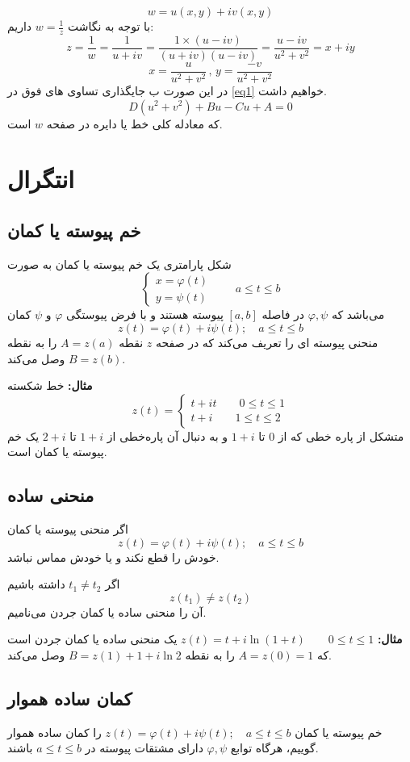 \documentclass[12pt]{report}
\begin{document}
	 $$w = u(x, y) + iv(x, y)$$
	 با توجه به نگاشت 
	 $w = \frac{1}{z}$
	 داریم:
	 $$z = \frac{1}{w} = \frac{1}{u + iv}=\frac{1 \times (u - iv)}{(u+iv)(u - iv)} = \frac{u - iv}{u^2+v^2} = x +iy$$
	 $$x = \frac{u}{u^2 + v^2}\,,\, y = \frac{-v}{u^2 + v^2}$$
	 در این صورت ب جایگذاری تساوی های فوق در 
	 \ref{eq1}
	 خواهیم داشت.
	 $$D(u^2 + v^2) + Bu -Cu + A = 0$$
	 که معادله کلی خط یا دایره در صفحه 
	 $w$
	 است.
	 \chapter{انتگرال}
	 \section{خم پیوسته یا کمان}
	 شکل پارامتری یک خم پیوسته یا کمان به صورت 
	 \[
	 \begin{cases}
	 	x = \varphi(t) \\
	 	y = \psi(t) 
	 \end{cases}
 \qquad a \leq t \leq b
	 \]
	 می‌باشد که 
	 $\varphi , \psi$
	 در فاصله 
	 $[a, b]$
	 پیوسته هستند و با فرض پیوستگی 
	 $\varphi$
	 و
	 $\psi$
	 کمان
	 $$z(t) = \varphi(t) + i\psi(t); \quad a \leq t \leq b$$
	 منحنی پیوسته ای را تعریف می‌کند که در صفحه 
	 $z$
	 نقطه 
	 $A = z(a)$
	 را به نقطه
	 $B = z(b)$
	 وصل می‌کند.
	 \newline
	 
	 \textbf{مثال:}
	 خط شکسته‌
	 \[
	 z(t) = 
	 \begin{cases}
	 	t + it \qquad 0\leq t\leq 1 \\
	 	t + i \qquad 1\leq t \leq 2
	 \end{cases}
	 \]
	 متشکل از پاره خطی که از 
	 $0$
	 تا 
	 $1 + i$
	 و به دنبال آن پاره‌خطی از 
	 $1+i$
	 تا
	 $2 + i$
	 یک خم پیوسته یا کمان است.
	 \section{منحنی ساده}
	 اگر منحنی پیوسته یا کمان
	 $$z(t) = \varphi(t)+ i\psi(t);\quad a \leq t \leq b$$
	 خودش را قطع نکند و یا خودش مماس نباشد.
	 
	 اگر 
	 $t_1 \neq t_2$
	 داشته باشیم
	 $$z(t_1) \neq z(t_2)$$
	 آن را منحنی ساده یا کمان جردن می‌نامیم.
	 \newline
	 
	 \textbf{مثال:}
	 $z(t) = t + i\ln(1 + t) \qquad 0\leq t \leq 1$
	 یک منحنی ساده یا کمان جردن است که 
	 $A = z(0) = 1$
	 را به نقطه
	 $B = z(1) + 1 + i\ln 2 $
	 وصل می‌کند.
	 \section{کمان ساده هموار}
	 خم پیوسته یا کمان 
	 $z(t) = \varphi(t) + i\psi(t); \quad a \leq t \leq b$
	 را کمان ساده هموار گوییم، هرگاه توابع 
	 $\varphi, \psi$
	 دارای مشتقات پیوسته در 
	 $a \leq t \leq b$
	 باشند.
	 \newline
	 
\end{document}

